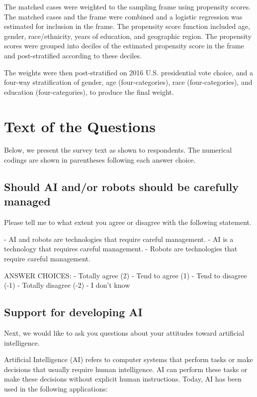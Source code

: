 \documentclass{article}
\begin{document}
The matched cases were weighted to the sampling frame using propensity scores. The matched cases and the frame were combined and a logistic regression was estimated for inclusion in the frame. The propensity score function included age, gender, race/ethnicity, years of education, and geographic region. The propensity scores were grouped into deciles of the estimated propensity score in the frame and post-stratified according to these deciles.

The weights were then post-stratified on 2016 U.S. presidential vote choice, and a four-way stratification of gender, age (four-categories), race (four-categories), and education (four-categories), to produce the final weight.

\section{Text of the Questions}

Below, we present the survey text as shown to respondents. The numerical codings are shown in parentheses following each answer choice. 

\subsection{Should AI and/or robots should be carefully managed}

\noindent Please tell me to what extent you agree or disagree with the following statement.


-  AI and robots are technologies that require careful management.
-  AI is a technology that requires careful management.
-  Robots are technologies that require careful management.

\noindent ANSWER CHOICES:
-  Totally agree (2)
-  Tend to agree (1)
-  Tend to disagree (-1)
-  Totally disagree (-2)
-  I don’t know

\subsection{Support for developing AI}


\noindent Next, we would like to ask you questions about your attitudes toward artificial intelligence.

\noindent Artificial Intelligence (AI) refers to computer systems that perform tasks or make decisions that usually require human intelligence. AI can perform these tasks or make these decisions without explicit human instructions. Today, AI has been used in the following applications:
\end{document}

